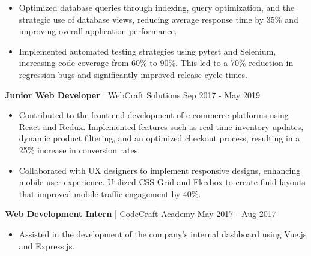 {\begin{itemize}
    \item Optimized database queries through indexing, query optimization, and the strategic use of database views, reducing average response time by 35\% and improving overall application performance.
    
    \item Implemented automated testing strategies using pytest and Selenium, increasing code coverage from 60\% to 90\%. This led to a 70\% reduction in regression bugs and significantly improved release cycle times.
\end{itemize}

\noindent
\textbf{Junior Web Developer} | WebCraft Solutions \hfill Sep 2017 - May 2019

\begin{itemize} 
    \item Contributed to the front-end development of e-commerce platforms using React and Redux. Implemented features such as real-time inventory updates, dynamic product filtering, and an optimized checkout process, resulting in a 25\% increase in conversion rates.
    
    \item Collaborated with UX designers to implement responsive designs, enhancing mobile user experience. Utilized CSS Grid and Flexbox to create fluid layouts that improved mobile traffic engagement by 40\%.
\end{itemize}

\noindent
\textbf{Web Development Intern} | CodeCraft Academy \hfill May 2017 - Aug 2017

\begin{itemize}
    \item Assisted in the development of the company's internal dashboard using Vue.js and Express.js.
\end{itemize}
}

\newcommand{\university}{Stanford University}
\newcommand{\universitylocation}{Stanford, CA, USA}
\newcommand{\educationdates}{Sep 2013 - Jun 2017}
\newcommand{\degree}{Bachelor of Science in Computer Science}
\newcommand{\educationdescription}{Graduated with honors from the School of Engineering. Completed a capstone project on "Artificial Intelligence in Healthcare: Predictive Analytics for Patient Outcomes". Active member of the university's Robotics Club, participating in national competitions.}

